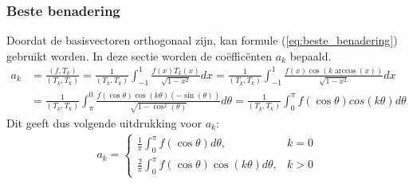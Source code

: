 \documentclass[a4paper, 12pt, titlepage, fleqn]{article}
\begin{document}
\subsubsection{Beste benadering}
Doordat de basisvectoren orthogonaal zijn, kan formule (\ref{eq:beste_benadering}) gebruikt worden. In deze sectie worden de co\"effic\"enten $a_k$ bepaald.
\begin{align*}
a_k &= \frac{(f,T_k)}{(T_k,T_k)} = \frac{1}{(T_k,T_k)}\int_{-1}^1\frac{f(x)T_k(x)}{\sqrt{1-x^2}}dx = \frac{1}{(T_k,T_k)}\int_{-1}^1\frac{f(x)\cos(k \arccos(x))}{\sqrt{1-x^2}}dx\\
&= \frac{1}{(T_k,T_k)}\int_\pi^0\frac{f(\cos \theta)\cos(k\theta)(-\sin(\theta))}{\sqrt{1-\cos^2(\theta)}}d\theta = \frac{1}{(T_k,T_k)}\int_0^\pi f(\cos \theta) cos(k\theta)d\theta
\end{align*}
Dit geeft dus volgende uitdrukking voor $a_k$:
\begin{align*}
a_k = \begin{cases}
\frac{1}{\pi}\int_0^\pi f(\cos \theta)d\theta, & k = 0\\
\frac{2}{\pi}\int_0^\pi f(\cos \theta)\cos(k\theta)d\theta, & k > 0
\end{cases}
\end{align*}
\end{document}
